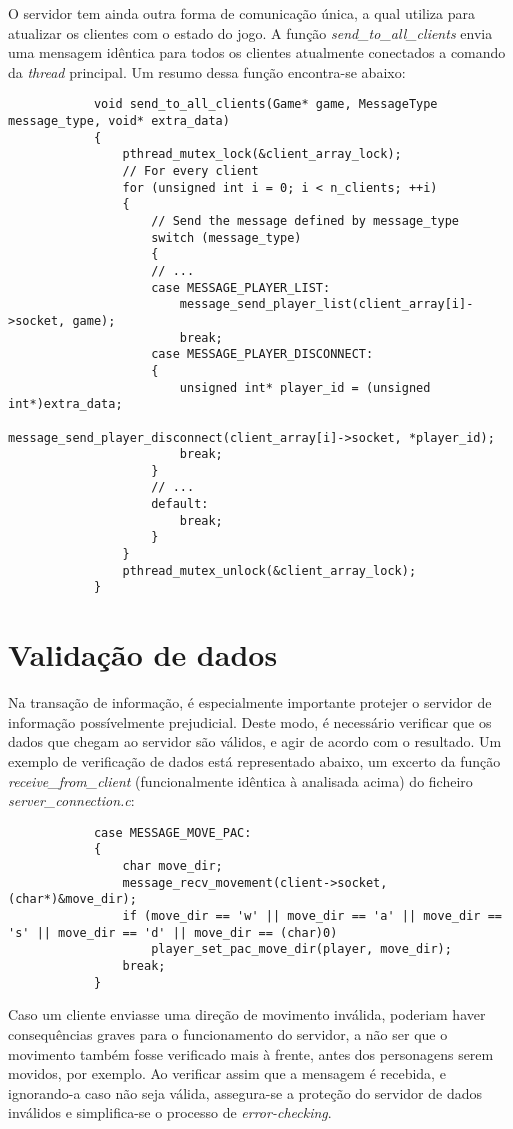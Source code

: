 \documentclass[a4paper]{report}
\begin{document}
        \par O servidor tem ainda outra forma de comunicação única, a qual utiliza para atualizar os clientes com o estado do jogo. A função \textit{send\_to\_all\_clients} envia uma mensagem idêntica para todos os clientes atualmente conectados a comando da \textit{thread} principal. Um resumo dessa função encontra-se abaixo:
        \begin{lstlisting}
            void send_to_all_clients(Game* game, MessageType message_type, void* extra_data)
            {
                pthread_mutex_lock(&client_array_lock);
                // For every client
                for (unsigned int i = 0; i < n_clients; ++i)
                {
                    // Send the message defined by message_type
                    switch (message_type)
                    {
                    // ...
                    case MESSAGE_PLAYER_LIST:
                        message_send_player_list(client_array[i]->socket, game);
                        break;
                    case MESSAGE_PLAYER_DISCONNECT:
                    {
                        unsigned int* player_id = (unsigned int*)extra_data;
                        message_send_player_disconnect(client_array[i]->socket, *player_id);
                        break;
                    }
                    // ...
                    default:
                        break;
                    }
                }
                pthread_mutex_unlock(&client_array_lock);
            }
        \end{lstlisting}

    \section{Validação de dados}
        \par Na transação de informação, é especialmente importante protejer o servidor de informação possívelmente prejudicial. Deste modo, é necessário verificar que os dados que chegam ao servidor são válidos, e agir de acordo com o resultado. Um exemplo de verificação de dados está representado abaixo, um excerto da função \textit{receive\_from\_client} (funcionalmente idêntica à analisada acima) do ficheiro \textit{server\_connection.c}:
        \begin{lstlisting}
            case MESSAGE_MOVE_PAC:
            {
                char move_dir;
                message_recv_movement(client->socket, (char*)&move_dir);
                if (move_dir == 'w' || move_dir == 'a' || move_dir == 's' || move_dir == 'd' || move_dir == (char)0)
                    player_set_pac_move_dir(player, move_dir);
                break;
            }
        \end{lstlisting}
        \par Caso um cliente enviasse uma direção de movimento inválida, poderiam haver consequências graves para o funcionamento do servidor, a não ser que o movimento também fosse verificado mais à frente, antes dos personagens serem movidos, por exemplo. Ao verificar assim que a mensagem é recebida, e ignorando-a caso não seja válida, assegura-se a proteção do servidor de dados inválidos e simplifica-se o processo de \textit{error-checking}.
\end{document}
